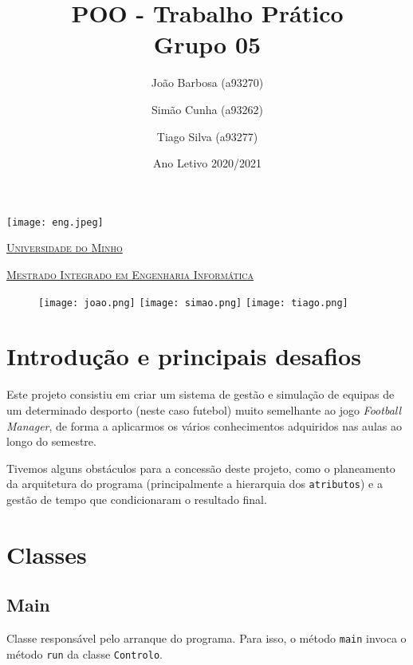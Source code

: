\documentclass[a4paper]{report}
\title{POO - Trabalho Prático\\
	\large Grupo 05}
\author{João Barbosa (a93270)
	\and Simão Cunha (a93262)
	\and Tiago Silva (a93277)}
\date{Ano Letivo 2020/2021}
\begin{document}
	\begin{minipage}{0.9\linewidth}
        \centering
		\texttt{[image: eng.jpeg]}\par\vspace{1cm}
		\href{https://www.uminho.pt/PT}
		{\scshape\LARGE Universidade do Minho} \par
		\vspace{0.6cm}
		\href{https://miei.di.uminho.pt/}
		{\scshape\Large Mestrado Integrado em Engenharia Informática} \par
		\maketitle
		\begin{figure}[H]
			\texttt{[image: joao.png]}
			\texttt{[image: simao.png]}
			\texttt{[image: tiago.png]}
		\end{figure}
	\end{minipage}
	
	\tableofcontents
	
	\pagebreak
	
	\chapter{Introdução e principais desafios}
%
	Este projeto consistiu em criar um sistema de gestão e simulação de equipas de um determinado
	desporto (neste caso futebol) muito semelhante ao jogo \textit{Football Manager}, de forma a
	aplicarmos os vários conhecimentos adquiridos nas aulas ao longo do semestre.
	
	Tivemos alguns obstáculos para a concessão deste projeto, como o planeamento da arquitetura do programa (principalmente a hierarquia dos \texttt{atributos}) e a gestão de tempo que condicionaram o resultado final.
	
	\chapter{Classes}
	\section{Main}
	Classe responsável pelo arranque do programa. Para isso, o método \texttt{main} invoca o método \texttt{run} da classe \texttt{Controlo}.
	
\end{document}
